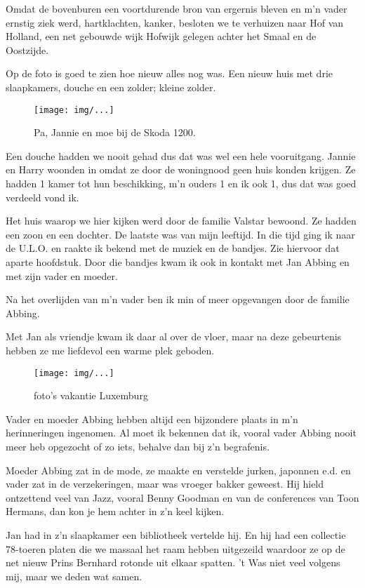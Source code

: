 \documentclass[10pt,twoside,openright]{memoir}
\begin{document}
Omdat de bovenburen een voortdurende bron van ergernis bleven en m’n vader ernstig ziek werd, hartklachten, kanker, besloten we te verhuizen naar Hof van Holland, een net gebouwde wijk Hofwijk gelegen achter het Smaal en de Oostzijde. 

Op de foto is goed te zien hoe nieuw alles nog was. Een nieuw huis met drie slaapkamers, douche en een zolder; kleine zolder. 

\begin{figure}[t]
\texttt{[image: img/...]}
\caption{Pa, Jannie en moe bij de Skoda 1200.}
\end{figure}

Een douche hadden we nooit gehad dus dat was wel een hele vooruitgang. Jannie en Harry woonden in omdat ze door de woningnood geen huis konden krijgen. Ze hadden 1 kamer tot hun beschikking, m’n ouders 1 en ik ook 1, dus dat was goed verdeeld vond ik. 

Het huis waarop we hier kijken werd door de familie Valstar bewoond. Ze hadden een zoon en een dochter. De laatste was van mijn leeftijd. In die tijd ging ik naar de U.L.O. en raakte ik bekend met de muziek en de bandjes. Zie hiervoor dat aparte hoofdstuk. Door die bandjes kwam ik ook in kontakt met Jan Abbing en met zijn vader en moeder. 

Na het overlijden van m’n vader ben ik min of meer opgevangen door de familie Abbing. 

Met Jan als vriendje kwam ik daar al over de vloer, maar na deze gebeurtenis hebben ze me liefdevol een warme plek geboden.

\begin{figure}[t]
\texttt{[image: img/...]}
\caption{foto’s vakantie Luxemburg}
\end{figure}

Vader en moeder Abbing hebben altijd een bijzondere plaats in m’n herinneringen ingenomen. Al moet ik bekennen dat ik, vooral vader Abbing nooit meer heb opgezocht of zo iets, behalve dan bij z’n begrafenis. 

Moeder Abbing zat in de mode, ze maakte en verstelde jurken, japonnen e.d. en vader zat in de verzekeringen, maar was vroeger bakker geweest. Hij hield ontzettend veel van Jazz, vooral Benny Goodman en van de conferences van Toon Hermans, dan kon je hem achter in z’n keel kijken. 

Jan had in z’n slaapkamer een bibliotheek vertelde hij. En hij had een collectie 78-toeren platen die we massaal het raam hebben uitgezeild waardoor ze op de net nieuw Prins Bernhard rotonde uit elkaar spatten. ’t Was niet veel volgens mij, maar we deden wat samen. 
\end{document}
